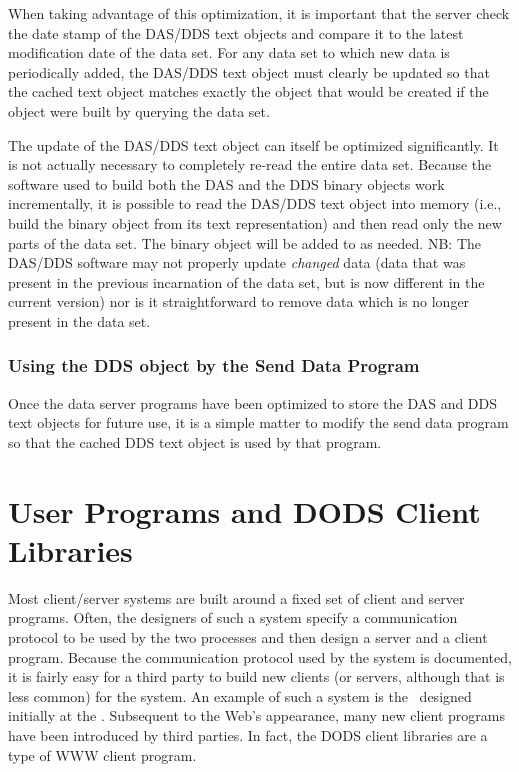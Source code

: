 When taking advantage of this optimization, it is important that the server
check the date stamp of the DAS/DDS text objects and compare it to the latest
modification date of the data set. For any data set to which new data is
periodically added, the DAS/DDS text object must clearly be updated so that
the cached text object matches exactly the object that would be created if
the object were built by querying the data set.

The update of the DAS/DDS text object can itself be optimized significantly.
It is not actually necessary to completely re-read the entire data set.
Because the software used to build both the DAS and the DDS binary objects
work incrementally, it is possible to read the DAS/DDS text object into
memory (i.e., build the binary object from its text representation) and then
read only the new parts of the data set. The binary object will be added to
as needed. NB: The DAS/DDS software may not properly update {\em changed\/}
data (data that was present in the previous incarnation of the data set, but
is now different in the current version) nor is it straightforward to remove
data which is no longer present in the data set.

\subsubsection{Using the DDS object by the Send Data Program}

Once the data server programs have been optimized to store the DAS and DDS
text objects for future use, it is a simple matter to modify the send data
program so that the cached DDS text object is used by that program. 

\section{User Programs and DODS Client Libraries}
\label{ddd:client}

Most client/server systems are built around a fixed set of client and server
programs. Often, the designers of such a system specify a communication
protocol to be used by the two processes and then design a server and a
client program. Because the communication protocol used by the system is
documented, it is fairly easy for a third party to build new clients (or
servers, although that is less common) for the system. An example of such a
system is the \www\ designed initially at the \CERN\@. Subsequent to the Web's
appearance, many new client programs have been introduced by third parties.
In fact, the DODS client libraries are a type of WWW client program.

